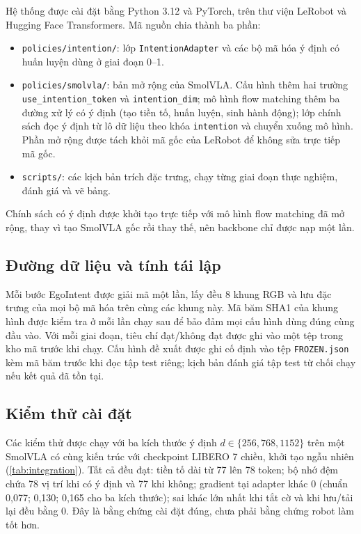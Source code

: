 \documentclass[a4paper,oneside]{report}
\begin{document}
Hệ thống được cài đặt bằng Python 3.12 và PyTorch, trên thư viện LeRobot \citep{cadene2026lerobot} và Hugging Face Transformers. Mã nguồn chia thành ba phần:
\begin{itemize}
  \item \texttt{policies/intention/}: lớp \texttt{IntentionAdapter} và các bộ mã hóa ý định có huấn luyện dùng ở giai đoạn 0--1.
  \item \texttt{policies/smolvla/}: bản mở rộng của SmolVLA. Cấu hình thêm hai trường \texttt{use\_intention\_token} và \texttt{intention\_dim}; mô hình flow matching thêm ba đường xử lý có ý định (tạo tiền tố, huấn luyện, sinh hành động); lớp chính sách đọc ý định từ lô dữ liệu theo khóa \texttt{intention} và chuyển xuống mô hình. Phần mở rộng được tách khỏi mã gốc của LeRobot để không sửa trực tiếp mã gốc.
  \item \texttt{scripts/}: các kịch bản trích đặc trưng, chạy từng giai đoạn thực nghiệm, đánh giá và vẽ bảng.
\end{itemize}
Chính sách có ý định được khởi tạo trực tiếp với mô hình flow matching đã mở rộng, thay vì tạo SmolVLA gốc rồi thay thế, nên backbone chỉ được nạp một lần.

\subsection{Đường dữ liệu và tính tái lập}

Mỗi bước EgoIntent được giải mã một lần, lấy đều 8 khung RGB và lưu đặc trưng của mọi bộ mã hóa trên cùng các khung này. Mã băm SHA1 của khung hình được kiểm tra ở mỗi lần chạy sau để bảo đảm mọi cấu hình dùng đúng cùng đầu vào. Với mỗi giai đoạn, tiêu chí đạt/không đạt được ghi vào một tệp trong kho mã trước khi chạy. Cấu hình đề xuất được ghi cố định vào tệp \texttt{FROZEN.json} kèm mã băm trước khi đọc tập test riêng; kịch bản đánh giá tập test từ chối chạy nếu kết quả đã tồn tại.

\subsection{Kiểm thử cài đặt}
\label{sec:integration_tests}

Các kiểm thử được chạy với ba kích thước ý định $d\in\{256, 768, 1152\}$ trên một SmolVLA có cùng kiến trúc với checkpoint LIBERO 7 chiều, khởi tạo ngẫu nhiên (\cref{tab:integration}). Tất cả đều đạt: tiền tố dài từ 77 lên 78 token; bộ nhớ đệm chứa 78 vị trí khi có ý định và 77 khi không; gradient tại adapter khác 0 (chuẩn 0,077; 0,130; 0,165 cho ba kích thước); sai khác lớn nhất khi tắt cờ và khi lưu/tải lại đều bằng 0. Đây là bằng chứng cài đặt đúng, chưa phải bằng chứng robot làm tốt hơn.
\end{document}
